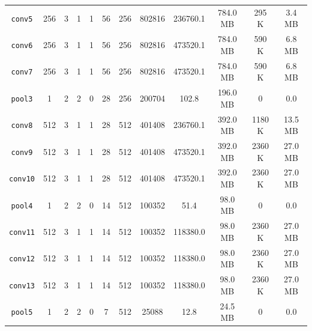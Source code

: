 \begin{table}[H]
\begin{tabular}{cccccccccccc}
        \cmidrule(lr){1-12}
        \texttt{conv5}   & 256  & 3  & 1  & 1  & 56  & \num{256}   & \num{802816}  & \num{236760.1} & \num{784.0} {\tiny MB}  & \num{295} {\tiny K}    & \num{3.4} {\tiny MB}     \\
        \texttt{conv6}   & 256  & 3  & 1  & 1  & 56  & \num{256}   & \num{802816}  & \num{473520.1} & \num{784.0} {\tiny MB}  & \num{590} {\tiny K}    & \num{6.8} {\tiny MB}     \\
        \texttt{conv7}   & 256  & 3  & 1  & 1  & 56  & \num{256}   & \num{802816}  & \num{473520.1} & \num{784.0} {\tiny MB}  & \num{590} {\tiny K}    & \num{6.8} {\tiny MB}     \\
        \texttt{pool3}   & 1    & 2  & 2  & 0  & 28  & \num{256}   & \num{200704}  & \num{102.8}    & \num{196.0} {\tiny MB}  & \num{0}                & \num{0.0}                \\
        \cmidrule(lr){1-12}
        \texttt{conv8}   & 512  & 3  & 1  & 1  & 28  & \num{512}   & \num{401408}  & \num{236760.1} & \num{392.0} {\tiny MB}  & \num{1180} {\tiny K}   & \num{13.5} {\tiny MB}    \\
        \texttt{conv9}   & 512  & 3  & 1  & 1  & 28  & \num{512}   & \num{401408}  & \num{473520.1} & \num{392.0} {\tiny MB}  & \num{2360} {\tiny K}   & \num{27.0} {\tiny MB}    \\
        \texttt{conv10}  & 512  & 3  & 1  & 1  & 28  & \num{512}   & \num{401408}  & \num{473520.1} & \num{392.0} {\tiny MB}  & \num{2360} {\tiny K}   & \num{27.0} {\tiny MB}    \\
        \texttt{pool4}   & 1    & 2  & 2  & 0  & 14  & \num{512}   & \num{100352}  & \num{51.4}     & \num{98.0} {\tiny MB}   & \num{0}                & \num{0.0}                \\
        \cmidrule(lr){1-12}
        \texttt{conv11}  & 512  & 3  & 1  & 1  & 14  & \num{512}   & \num{100352}  & \num{118380.0} & \num{98.0} {\tiny MB}   & \num{2360} {\tiny K}   & \num{27.0} {\tiny MB}    \\
        \texttt{conv12}  & 512  & 3  & 1  & 1  & 14  & \num{512}   & \num{100352}  & \num{118380.0} & \num{98.0} {\tiny MB}   & \num{2360} {\tiny K}   & \num{27.0} {\tiny MB}    \\
        \texttt{conv13}  & 512  & 3  & 1  & 1  & 14  & \num{512}   & \num{100352}  & \num{118380.0} & \num{98.0} {\tiny MB}   & \num{2360} {\tiny K}   & \num{27.0} {\tiny MB}    \\
        \texttt{pool5}   & 1    & 2  & 2  & 0  & 7   & \num{512}   & \num{25088}   & \num{12.8}     & \num{24.5} {\tiny MB}   & \num{0}                & \num{0.0}                \\

\end{tabular}
\end{table}

